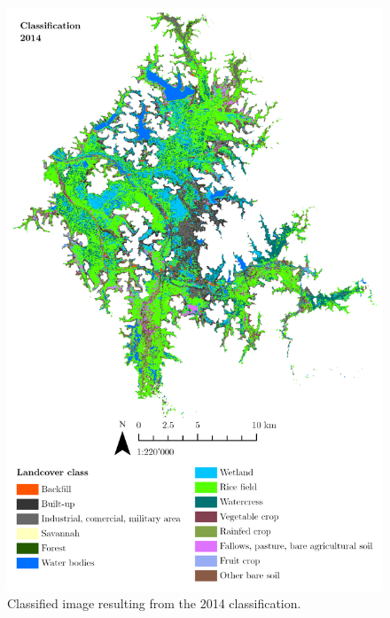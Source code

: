 \begin{figure}[H]
    \centering
    \includegraphics[width = 15cm]{figures/classi2014.png}
    \caption{Classified image resulting from the 2014 classification.}
    \label{}
\end{figure}

